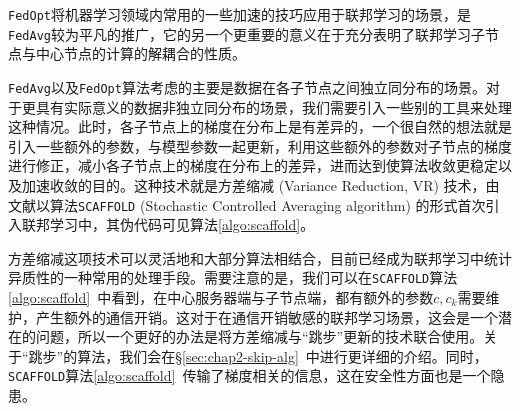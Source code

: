 \texttt{FedOpt}将机器学习领域内常用的一些加速的技巧应用于联邦学习的场景，是\texttt{FedAvg}较为平凡的推广，它的另一个更重要的意义在于充分表明了联邦学习子节点与中心节点的计算的解耦合的性质。

\texttt{FedAvg}以及\texttt{FedOpt}算法考虑的主要是数据在各子节点之间独立同分布的场景。对于更具有实际意义的数据非独立同分布的场景，我们需要引入一些别的工具来处理这种情况。此时，各子节点上的梯度在分布上是有差异的，一个很自然的想法就是引入一些额外的参数，与模型参数一起更新，利用这些额外的参数对子节点的梯度进行修正，减小各子节点上的梯度在分布上的差异，进而达到使算法收敛更稳定以及加速收敛的目的。这种技术就是方差缩减 (Variance Reduction, VR) 技术\cite{johnson2013accelerating}，由文献\parencite{karimireddy2020scaffold}以算法\texttt{SCAFFOLD} (Stochastic Controlled Averaging algorithm) 的形式首次引入联邦学习中，其伪代码可见算法\ref{algo:scaffold}。



方差缩减这项技术可以灵活地和大部分算法相结合，目前已经成为联邦学习中统计异质性的一种常用的处理手段。需要注意的是，我们可以在\texttt{SCAFFOLD}算法\ref{algo:scaffold}~中看到，在中心服务器端与子节点端，都有额外的参数$c, c_k$需要维护，产生额外的通信开销。这对于在通信开销敏感的联邦学习场景，这会是一个潜在的问题，所以一个更好的办法是将方差缩减与``跳步''更新的技术联合使用\cite{proxskip-vr}。关于``跳步''的算法，我们会在\S\ref{sec:chap2-skip-alg}~中进行更详细的介绍。同时，\texttt{SCAFFOLD}算法\ref{algo:scaffold}~传输了梯度相关的信息，这在安全性方面\cite{zhu2019deep_leakage}也是一个隐患。
